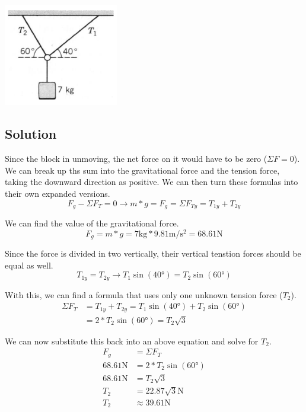\documentclass[12pt]{article}
\begin{document}
\begin{center}
    \includegraphics*[width=5cm]{graph_4.png}
\end{center}

\subsection*{Solution}
Since the block in unmoving, the net force on it would have to be zero ($\Sigma F = 0$). We can break up ths sum into the gravitational force and the tension force, taking the downward direction as positive. We can then turn these formulas into their own expanded versions.
\[ F_g - \Sigma F_T = 0 \rightarrow m*g = F_g = \Sigma F_{Ty} = T_{1y} + T_{2y} \]

We can find the value of the gravitational force.
\[ 
    F_g = m*g 
        = 7\unit{\kilo\gram} * 9.81\unit{\meter/\second^2} 
        = 68.61\unit{\newton} 
\]

Since the force is divided in two vertically, their vertical tenstion forces should be equal as well. 
\[ T_{1y} = T_{2y} \rightarrow T_1\sin(40\unit{\degree}) = T_2\sin(60\unit{\degree}) \]

With this, we can find a formula that uses only one unknown tension force ($T_2$).
\begin{align*}
    \Sigma F_T &= T_{1y} + T_{2y}
            = T_1\sin(40\unit{\degree}) + T_2\sin(60\unit{\degree})\\
            &= 2 * T_2\sin(60\unit{\degree})
            = T_2 \sqrt{3}
\end{align*}

We can now substitute this back into an above equation and solve for $T_2$.
\begin{align*}
    F_g &= \Sigma F_T\\
    68.61\unit{\newton} &= 2*T_2 \sin(60\unit{\degree})\\
    68.61\unit{\newton} &= T_2 \sqrt{3}\\
    T_2 &= 22.87\sqrt{3} \unit{\newton}\\
    T_2 &\approx \boxed{ 39.61\unit{\newton} }
\end{align*}
\end{document}
